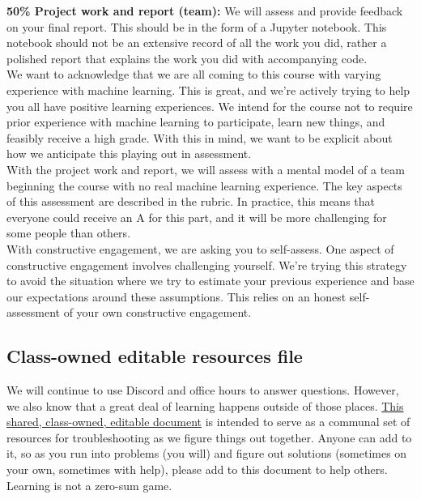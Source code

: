 \documentclass{tufte-handout}
\begin{document}
\textbf{50\% Project work and report (team):}  We will assess and provide feedback on your final report. This should be in the form of a Jupyter notebook. This notebook should not be an extensive record of all the work you did, rather a polished report that explains the work you did with accompanying code. \\

\vspace{1em}
We want to acknowledge that we are all coming to this course with varying experience with machine learning. This is great, and we’re actively trying to help you all have positive learning experiences. We intend for the course not to require prior experience with machine learning to participate, learn new things, and feasibly receive a high grade. With this in mind, we want to be explicit about how we anticipate this playing out in assessment. \\
With the project work and report, we will assess with a mental model of a team beginning the course with no real machine learning experience. The key aspects of this assessment are described in the rubric. In practice, this means that everyone could receive an A for this part, and it will be more challenging for some people than others. \\
With constructive engagement, we are asking you to self-assess. One aspect of constructive engagement involves challenging yourself. 
We’re trying this strategy to avoid the situation where we try to estimate your previous experience and base our expectations around these assumptions. This relies on an honest self-assessment of your own constructive engagement. 

\subsection{Class-owned editable resources file}

We will continue to use Discord and office hours to answer questions. However, we also know that a great deal of learning happens outside of those places.  \href{https://docs.google.com/document/d/14C1dtiLiPF2cAy3alt4PLl0UhkuxPrDZsHgeq-pjwAU/edit?usp=sharing}{This shared, class-owned, editable document} is intended to serve as a communal set of resources for troubleshooting as we figure things out together. Anyone can add to it, so as you run into problems (you will) and figure out solutions (sometimes on your own, sometimes with help), please add to this document to help others. Learning is not a zero-sum game.
\end{document}
